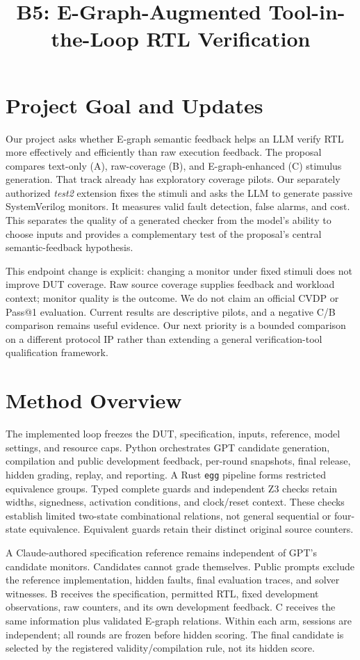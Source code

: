 \documentclass[conference,10pt,letterpaper]{IEEEtran}
\title{B5: E-Graph-Augmented Tool-in-the-Loop RTL Verification}
\author{\IEEEauthorblockN{Chiyu Chen (cc5583), Mingyuan Zheng (mz3143), Yiwen Chen (yc4653)}
\IEEEauthorblockA{COMS 6998: AI-Native Computing $\mid$ Fall 2026\\
P2: Prototype \& Pilot Results $\mid$ Due November 9, 2026, 11:59 PM ET}}
\begin{document}
\maketitle
\thispagestyle{plain}
\pagestyle{plain}

\section{Project Goal and Updates}
Our project asks whether E-graph semantic feedback helps an LLM verify RTL more
effectively and efficiently than raw execution feedback. The proposal compares
text-only (A), raw-coverage (B), and E-graph-enhanced (C) stimulus generation.
That track already has exploratory coverage pilots. Our separately authorized
\emph{test2} extension fixes the stimuli and asks the LLM to generate passive
SystemVerilog monitors. It measures valid fault detection, false alarms, and
cost. This separates the quality of a generated checker from the model's ability
to choose inputs and provides a complementary test of the proposal's central
semantic-feedback hypothesis.

This endpoint change is explicit: changing a monitor under fixed stimuli does
not improve DUT coverage. Raw source coverage supplies feedback and workload
context; monitor quality is the outcome. We do not claim an official CVDP or
Pass@1 evaluation. Current results are descriptive pilots, and a negative C/B
comparison remains useful evidence. Our next priority is a bounded comparison
on a different protocol IP rather than extending a general verification-tool
qualification framework.

\section{Method Overview}
The implemented loop freezes the DUT, specification, inputs, reference, model
settings, and resource caps. Python orchestrates GPT candidate generation,
compilation and public development feedback, per-round snapshots, final release,
hidden grading, replay, and reporting. A Rust \texttt{egg} pipeline forms
restricted equivalence groups. Typed complete guards and independent Z3 checks
retain widths, signedness, activation conditions, and clock/reset context.
These checks establish limited two-state combinational relations, not general
sequential or four-state equivalence. Equivalent guards retain their distinct
original source counters.

A Claude-authored specification reference remains independent of GPT's candidate
monitors. Candidates cannot grade themselves. Public prompts exclude the
reference implementation, hidden faults, final evaluation traces, and solver
witnesses. B receives the specification, permitted RTL, fixed development
observations, raw counters, and its own development feedback. C receives the same
information plus validated E-graph relations. Within each arm, sessions are
independent; all rounds are frozen before hidden scoring. The final candidate
is selected by the registered validity/compilation rule, not its hidden score.
\end{document}
